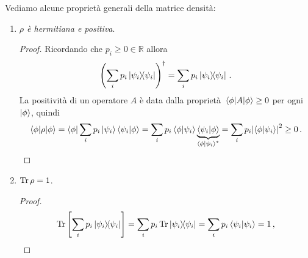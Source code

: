 \noindent {}
\vspace{0.5cm}

\noindent Vediamo alcune proprietà generali della matrice densità:
\begin{enumerate}
    \item \textit{$\rho$ è hermitiana e positiva}. 
    \begin{proof}
        Ricordando che $p_i \geq 0 \in \mathbb{R}$ allora
        \begin{equation*}
            \left( \sum_i p_i \ketbra{\psi_i} \right)^\dag = \sum_i p_i \ketbra{\psi_i} \, .
        \end{equation*}
        La positività di un operatore $A$ è data dalla proprietà $\expval{A}{\phi} \geq 0$ per ogni $\ket{\phi}$, quindi
        \begin{equation*}
            \expval{\rho}{\phi} = \bra{\phi} \sum_i p_i \ket{\psi_i} \braket{\psi_i}{\phi} = \sum_i p_i \braket{\phi}{\psi_i} \underbrace{\braket{\psi_i}{\phi}}_{\braket{\phi}{\psi_i}^\ast} = \sum_i p_i \abs{\braket{\phi}{\psi_i}}^2 \geq 0 \, .
        \end{equation*}
    \end{proof}
    
    \item $\Tr \rho = 1$.
    \begin{proof}
        \begin{equation*}
            \Tr \left[ \sum_i p_i \ketbra{\psi_i} \right] = \sum_i p_i \Tr \ketbra{\psi_i} = \sum_i p_i \braket{\psi_i} = 1 \, ,
        \end{equation*}
    \end{proof}
    

\end{enumerate}
